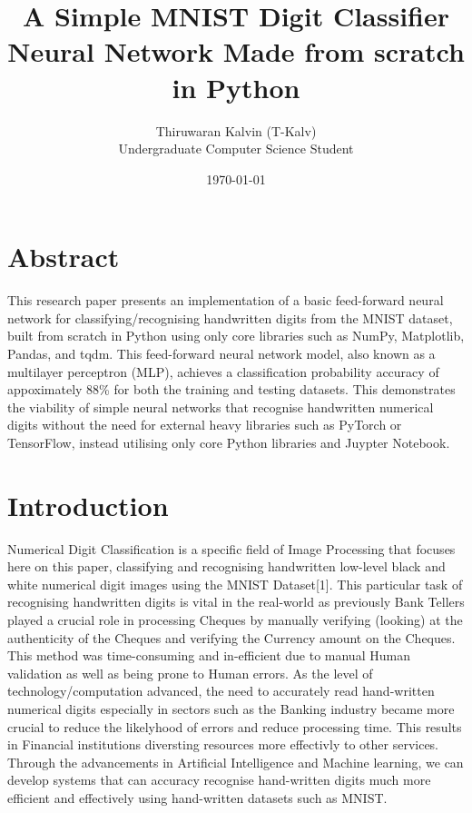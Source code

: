 \documentclass[11pt]{article}
\title{A Simple MNIST Digit Classifier Neural Network Made from scratch in Python}
\author{Thiruwaran Kalvin (T-Kalv) \\
Undergraduate Computer Science Student}
\date{\today}
\begin{document}
\maketitle

\section{Abstract}
This research paper presents an implementation of a basic feed-forward neural network for classifying/recognising handwritten digits from the MNIST dataset, built from scratch in Python using only core libraries such as NumPy, Matplotlib, Pandas, and tqdm. This feed-forward neural network model, also known as a multilayer perceptron (MLP), achieves a classification probability accuracy of appoximately 88\% for both the training and testing datasets. This demonstrates the viability of simple neural networks that recognise handwritten numerical digits without the need for external heavy libraries such as PyTorch or TensorFlow, instead utilising only core Python libraries and Juypter Notebook.

\section{Introduction}
Numerical Digit Classification is a specific field of Image Processing that focuses here on this paper, classifying and recognising handwritten low-level black and white numerical digit images using the MNIST Dataset[1]. This particular task of recognising handwritten digits is vital in the real-world as previously Bank Tellers played a crucial role in processing Cheques by manually verifying (looking) at the authenticity of the Cheques and verifying the Currency amount on the Cheques. This method was time-consuming and in-efficient due to manual Human validation as well as being prone to Human errors. As the level of technology/computation advanced, the need to accurately read hand-written numerical digits especially in sectors such as the Banking industry became more crucial to reduce the likelyhood of errors and reduce processing time. This results in Financial institutions diversting resources more effectivly to other services. Through the advancements in Artificial Intelligence and Machine learning, we can develop systems that can accuracy recognise hand-written digits much more efficient and effectively using hand-written datasets such as MNIST.
\end{document}
